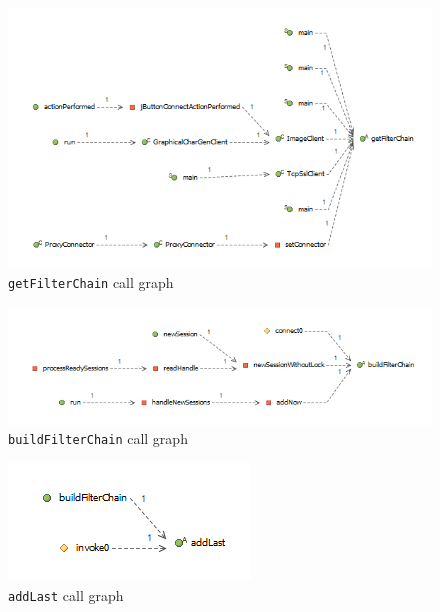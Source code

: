 \begin{figure}[H]
    \centering
    \includegraphics[width=\textwidth]{images/getfilterchain.png}
    \caption{\texttt{getFilterChain} call graph}
    \label{fig:getfilterchain}
\end{figure}
\begin{figure}[H]
    \centering
    \includegraphics[width=\textwidth]{images/buildfilterchain.png}
    \caption{\texttt{buildFilterChain} call graph}
    \label{fig:buildfilterchain}
\end{figure}

\begin{figure}[H]
    \centering
    \includegraphics{images/addlast.png}
    \caption{\texttt{addLast} call graph}
    \label{fig:addlast}
\end{figure}

